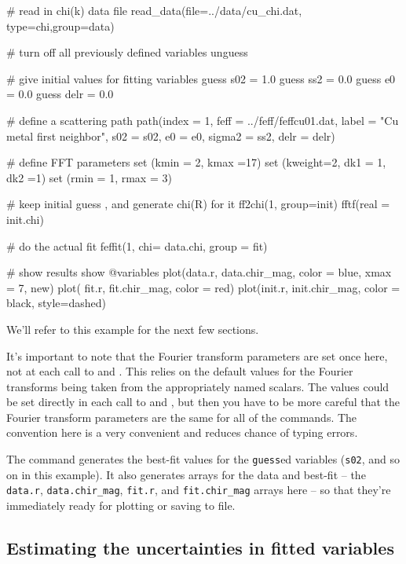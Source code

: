 {\small{
\begin{VerbSBox}
# read in chi(k) data file
  read_data(file=../data/cu_chi.dat, type=chi,group=data)

# turn off all previously defined variables
  unguess         

# give initial values for fitting variables
  guess s02  = 1.0
  guess ss2  = 0.0
  guess e0   = 0.0
  guess delr = 0.0

# define a scattering path 
  path(index  = 1,  
       feff   = ../feff/feffcu01.dat, 
       label  = "Cu metal first neighbor", 
       s02    = s02, 
       e0     =  e0, 
       sigma2 = ss2,  
       delr   = delr)

# define FFT parameters
  set (kmin = 2, kmax =17)
  set (kweight=2, dk1 = 1, dk2 =1)
  set (rmin = 1, rmax = 3)

# keep initial guess , and generate chi(R) for it
  ff2chi(1, group=init)
  fftf(real = init.chi) 

# do the actual fit
  feffit(1, chi= data.chi, group = fit) 
 
# show results
  show @variables
  plot(data.r, data.chir_mag, color = blue, xmax = 7, new)
  plot( fit.r,  fit.chir_mag, color = red)
  plot(init.r, init.chir_mag, color = black, style=dashed)

\end{VerbSBox}
}}\noindent
We'll refer to this example for the next few sections.

It's important to note that the Fourier transform parameters are set once
here, not at each call to {} and {}.  This relies
on the default values for the Fourier transforms being taken from the
appropriately named scalars.  The values could be set directly in each call
to {} and {}, but then you have to be more careful
that the Fourier transform parameters are the same for all of the commands.
The convention here is a very convenient and reduces chance of typing
errors.

The {} command generates the best-fit values for the
{\tt{guess}}ed variables ({\tt{s02}}, and so on in this example).  It also
generates {\chir} arrays for the data and best-fit -- the {\tt{data.r}},
{\tt{data.chir\_mag}}, {\tt{fit.r}}, and {\tt{fit.chir\_mag}} arrays here
-- so that they're immediately ready for plotting or saving to file. 

\subsection{Estimating the uncertainties in fitted variables}
\label{Ch:FEFFIT-error}

